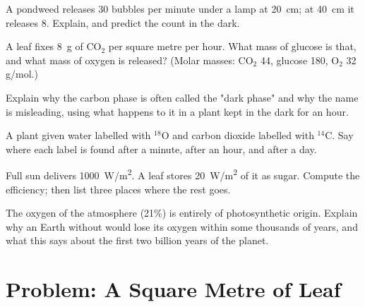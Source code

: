 \begin{exercise}[$\star\star$]\label{exo:g12:photosynthesis:10}
A pondweed releases 30 bubbles per minute under a lamp at
\qty{20}{cm}; at \qty{40}{cm} it releases 8. Explain, and predict the
count in the dark.
\end{exercise}

\begin{exercise}[$\star\star$]\label{exo:g12:photosynthesis:11}
A leaf fixes \qty{8}{g} of $\mathrm{CO_2}$ per square metre per hour.
What mass of glucose is that, and what mass of oxygen is released?
(Molar masses: $\mathrm{CO_2}$ 44, glucose 180, $\mathrm{O_2}$ 32
\unit{g/mol}.)
\end{exercise}

\begin{exercise}[$\star\star\star$]\label{exo:g12:photosynthesis:12}
Explain why the carbon phase is often called the "dark phase" and why
the name is misleading, using what happens to it in a plant kept in
the dark for an hour.
\end{exercise}

\begin{exercise}[$\star\star\star$]\label{exo:g12:photosynthesis:13}
A plant given water labelled with $^{18}$O and carbon dioxide
labelled with $^{14}$C. Say where each label is found after a minute,
after an hour, and after a day.
\end{exercise}

\begin{exercise}[$\star\star\star$]\label{exo:g12:photosynthesis:14}
Full sun delivers \qty{1000}{W/m^2}. A leaf stores \qty{20}{W/m^2} of
it as sugar. Compute the efficiency; then list three places where the
rest goes.
\end{exercise}

\begin{exercise}[$\star\star\star$]\label{exo:g12:photosynthesis:15}
The oxygen of the atmosphere (21\%) is entirely of photosynthetic
origin. Explain why an Earth without  would lose its
oxygen within some thousands of years, and what this says about the
first two billion years of the planet.
\end{exercise}

\section{Problem: A Square Metre of Leaf}

